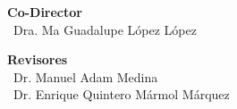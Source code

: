 \begin{titlepage}
\begin{center}
		{\large\textbf{Co-Director}}\\
		\vspace{0.5cm}
		{\large\ Dra. Ma Guadalupe López López }\\
		\vspace{1cm}
				
		{\large\textbf{Revisores}}\\
		\vspace{0.5cm}
		{\large\ Dr. Manuel Adam Medina}\\
		{\large\ Dr. Enrique Quintero Mármol Márquez}\\

		
		
		
		
	\end{center}
	
	
	
\end{titlepage}
	
	